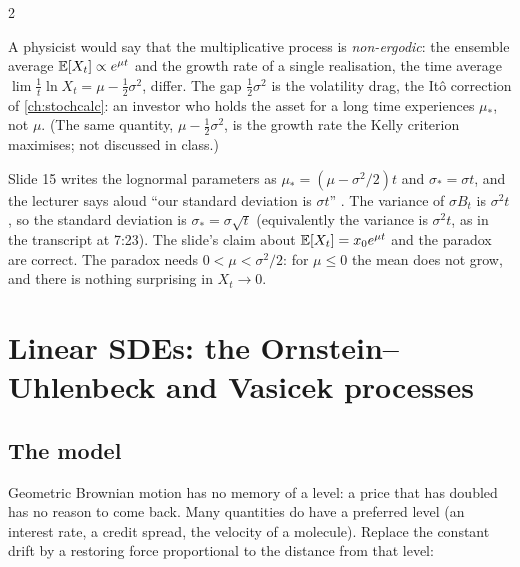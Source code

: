\begin{paracol}{2}
\begin{intuition}
A physicist would say that the multiplicative process is \emph{non-ergodic}: the ensemble average $\mathbb{E}[X_t]\propto e^{\mu t}$ and the growth rate of a single realisation, the time average $\lim\frac1t\ln X_t=\mu-\tfrac12\sigma^2$, differ. The gap $\tfrac12\sigma^2$ is the volatility drag, the It\^o correction of \cref{ch:stochcalc}: an investor who holds the asset for a long time experiences $\mu_*$, not $\mu$. (The same quantity, $\mu-\tfrac12\sigma^2$, is the growth rate the Kelly criterion maximises; not discussed in class.)
\end{intuition}
\begin{coursenote}
Slide 15 writes the lognormal parameters as $\mu_*=(\mu-\sigma^2/2)t$ and $\sigma_*=\sigma t$, and the lecturer says aloud ``our standard deviation is $\sigma t$'' . The variance of $\sigma B_t$ is $\sigma^2t$, so the standard deviation is $\sigma_*=\sigma\sqrt t$ (equivalently the variance is $\sigma^2t$, as in the transcript at 7:23). The slide's claim about $\mathbb{E}[X_t]=x_0e^{\mu t}$ and the paradox are correct. The paradox needs $0<\mu<\sigma^2/2$: for $\mu\le0$ the mean does not grow, and there is nothing surprising in $X_t\to0$.
\end{coursenote}

\section{Linear SDEs: the Ornstein--Uhlenbeck and Vasicek processes}\label{ch18:sec-ou}

\subsection{The model}
Geometric Brownian motion has no memory of a level: a price that has doubled has no reason to come back. Many quantities do have a preferred level (an interest rate, a credit spread, the velocity of a molecule). Replace the constant drift by a restoring force proportional to the distance from that level:


\end{paracol}
